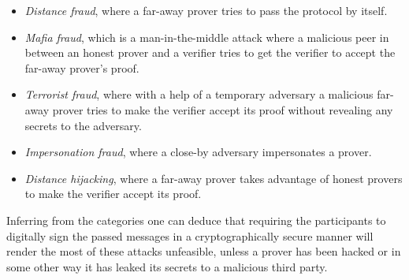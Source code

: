 \begin{itemize}
  \item \emph{Distance fraud}, where a far-away prover tries to pass the protocol by itself.
  \item \emph{Mafia fraud}, which is a man-in-the-middle attack where a malicious peer in between an honest prover and a verifier tries to get the verifier to accept the far-away prover's proof.
  \item \emph{Terrorist fraud}, where with a help of a temporary adversary a malicious far-away prover tries to make the verifier accept its proof without revealing any secrets to the adversary.
  \item \emph{Impersonation fraud}, where a close-by adversary impersonates a prover.
  \item \emph{Distance hijacking}, where a far-away prover takes advantage of honest provers to make the verifier accept its proof.
\end{itemize}

Inferring from the categories one can deduce that requiring the participants to digitally sign the passed messages in a cryptographically secure manner will render the most of these attacks unfeasible, unless a prover has been hacked or in some other way it has leaked its secrets to a malicious third party.
